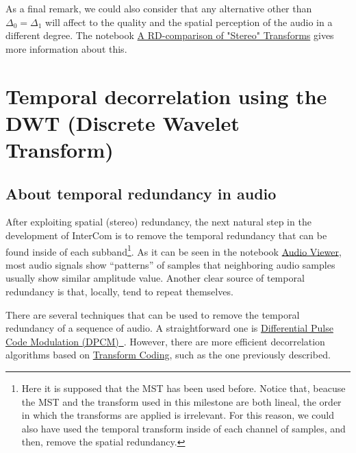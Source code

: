 As a final remark, we could also consider that any alternative other
than $\Delta_0=\Delta_1$ will affect to the quality and the spatial
perception of the audio in a different degree. The notebook
\href{https://github.com/Tecnologias-multimedia/Tecnologias-multimedia.github.io/blob/master/contents/transform_coding/stereo_transforms_RD.ipynb}{A
  RD-comparison of "Stereo" Transforms} gives more information about
this.



\section{Temporal decorrelation using the DWT (Discrete Wavelet Transform)}

\subsection{About temporal redundancy in audio}

After exploiting spatial (stereo) redundancy, the next natural step in
the development of InterCom is to remove the temporal redundancy that
can be found inside of each subband\footnote{Here it is supposed that
  the MST has been used before. Notice that, beacuse the MST and the
  transform used in this milestone are both lineal, the order in which
  the transforms are applied is irrelevant. For this reason, we could
  also have used the temporal transform inside of each channel of
  samples, and then, remove the spatial redundancy.}. As it can be
seen in the notebook
\href{https://github.com/Tecnologias-multimedia/intercom/blob/master/tools/audio_viewer.ipynb}{Audio
  Viewer}, most audio signals show ``patterns'' of samples that
neighboring audio samples usually show similar amplitude
value. Another clear source of temporal redundancy is that, locally,
tend to repeat themselves.

There are several techniques that can be used to remove the
temporal redundancy of a sequence of audio. A
straightforward one is
\href{https://en.wikipedia.org/wiki/Differential_pulse-code_modulation}{Differential
  Pulse Code Modulation
  (DPCM)~\cite{sayood2017introduction}}. However, there are more
efficient decorrelation algorithms based on
\href{https://en.wikipedia.org/wiki/Transform_coding}{Transform
  Coding}, such as the one previously described.

